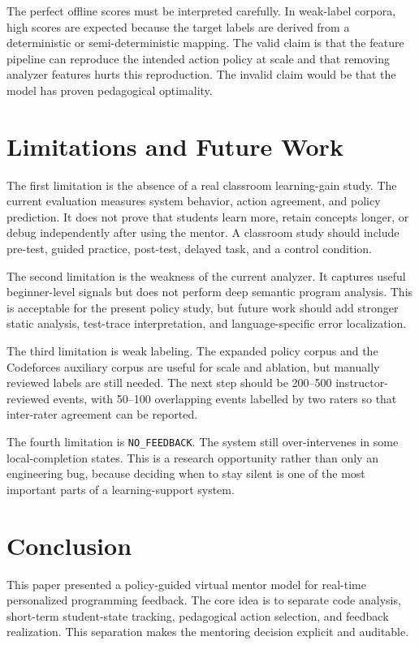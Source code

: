 \documentclass[twoside, 11pt]{article}
\begin{document}
The perfect offline scores must be interpreted carefully. In weak-label corpora, high scores are expected because the target labels are derived from a deterministic or semi-deterministic mapping. The valid claim is that the feature pipeline can reproduce the intended action policy at scale and that removing analyzer features hurts this reproduction. The invalid claim would be that the model has proven pedagogical optimality.

\section{\large Limitations and Future Work}

The first limitation is the absence of a real classroom learning-gain study. The current evaluation measures system behavior, action agreement, and policy prediction. It does not prove that students learn more, retain concepts longer, or debug independently after using the mentor. A classroom study should include pre-test, guided practice, post-test, delayed task, and a control condition.

The second limitation is the weakness of the current analyzer. It captures useful beginner-level signals but does not perform deep semantic program analysis. This is acceptable for the present policy study, but future work should add stronger static analysis, test-trace interpretation, and language-specific error localization.

The third limitation is weak labeling. The expanded policy corpus and the Codeforces auxiliary corpus are useful for scale and ablation, but manually reviewed labels are still needed. The next step should be 200--500 instructor-reviewed events, with 50--100 overlapping events labelled by two raters so that inter-rater agreement can be reported.

The fourth limitation is \texttt{NO\_FEEDBACK}. The system still over-intervenes in some local-completion states. This is a research opportunity rather than only an engineering bug, because deciding when to stay silent is one of the most important parts of a learning-support system.

\section{\large Conclusion}

This paper presented a policy-guided virtual mentor model for real-time personalized programming feedback. The core idea is to separate code analysis, short-term student-state tracking, pedagogical action selection, and feedback realization. This separation makes the mentoring decision explicit and auditable.
\end{document}
